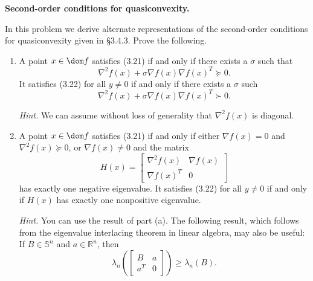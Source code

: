 \documentclass{ctexart}
\begin{document}
\begin{problem}\label{3.44}
  \textbf{Second-order conditions for quasiconvexity.}

  In this problem we derive alternate representations of the second-order
  conditions for quasiconvexity given in \S3.4.3. Prove the following.
  \begin{enumerate}
    \item A point $x\in\dom f$ satisfies (3.21) if and only if there exists a $\sigma$
      such that
      \begin{equation}\tag{3.26}
        \nabla^2f(x)+\sigma\nabla f(x)\nabla f(x)^T\succeq0.
      \end{equation}
      It satisfies (3.22) for all $y\neq0$ if and only if there exists a $\sigma$ such
      \begin{equation}\tag{3.27}
        \nabla^2f(x)+\sigma\nabla f(x)\nabla f(x)^T\succ0.
      \end{equation}

      \textit{Hint.} We can assume without loss of generality that $\nabla^2f(x)$ is diagonal.

    \item A point $x\in\dom f$ satisfies (3.21) if and only if either
      $\nabla f(x)=0$ and $\nabla^2f(x)\succeq0$, or $\nabla f(x)\neq0$ and the matrix
      \[
        H(x)=
        \begin{bmatrix}
          \nabla^2f(x)&\nabla f(x)\\
          \nabla f(x)^T&0
        \end{bmatrix}
      \]
      has exactly one negative eigenvalue. It satisfies (3.22) for all $y\neq0$
      if and only if $H(x)$ has exactly one nonpositive eigenvalue.

      \textit{Hint.} You can use the result of part (a). The following result, which
      follows from the eigenvalue interlacing theorem in linear algebra, may also be
      useful: If $B\in\mathbb{S}^n$ and $a\in\mathbb{R}^n$, then
      \[
        \lambda_n\!\left(
          \begin{bmatrix}B&a\\a^T&0
        \end{bmatrix}\right)
        \geq\lambda_n(B).
      \]
  \end{enumerate}
\end{problem}
\end{document}
